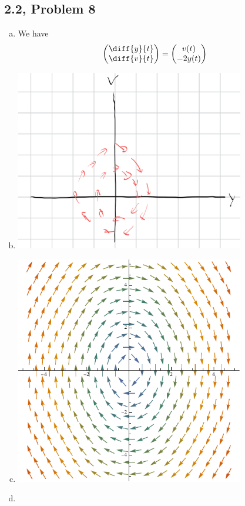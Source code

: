\documentclass[10pt]{mypackage}
\begin{document}
\subsection{2.2, Problem 8}%
\begin{enumerate}[(a)]
  \item We have
    \begin{align*}
      \begin{pmatrix}\diff{y}{t} \\ \diff{v}{t}\end{pmatrix} &= \begin{pmatrix}v(t)\\-2y(t)\end{pmatrix}
    \end{align*}
  \item \hfill
    \begin{center}
      \includegraphics[width=10cm]{images/2_2_8b.png}
    \end{center}
  \item \hfill
    \begin{center}
      \includegraphics[width=10cm]{images/2_2_8c.pdf}
    \end{center}
  \item 
\end{enumerate}
\end{document}
